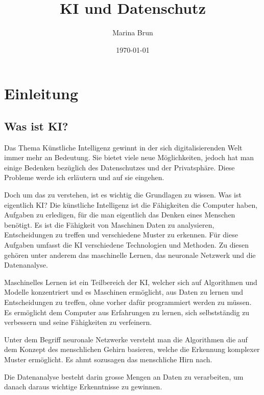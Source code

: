 \documentclass{report}
\title{KI und Datenschutz}
\author{Marina Brun}
\date{\today}
\begin{document}
\maketitle



\tableofcontents

\chapter{Einleitung}

\section{Was ist KI?}

Das Thema Künstliche Intelligenz gewinnt in der sich digitalisierenden Welt immer mehr an Bedeutung. Sie bietet viele neue Möglichkeiten, jedoch hat man einige Bedenken bezüglich des Datenschutzes und der Privatsphäre. Diese Probleme werde ich erläutern und auf sie eingehen.

\vspace{2mm}Doch um das zu verstehen, ist es wichtig die Grundlagen zu wissen. Was ist eigentlich KI? Die künstliche Intelligenz ist die Fähigkeiten die Computer haben, Aufgaben zu erledigen, für die man eigentlich das Denken eines Menschen benötigt. Es ist die Fähigkeit von Maschinen Daten zu analysieren, Entscheidungen zu treffen und verschiedene Muster zu erkennen. Für diese Aufgaben umfasst die KI verschiedene Technologien und Methoden. Zu diesen gehören unter anderem das maschinelle Lernen, das neuronale Netzwerk und die Datenanalyse.

\vspace{2mm}Maschinelles Lernen ist ein Teilbereich der KI, welcher sich auf Algorithmen und Modelle konzentriert und es Maschinen ermöglicht, aus Daten zu lernen und Entscheidungen zu treffen, ohne vorher dafür programmiert werden zu müssen. Es ermöglicht dem Computer aus Erfahrungen zu lernen, sich selbstständig zu verbessern und seine Fähigkeiten zu verfeinern.

\vspace{2mm}Unter dem Begriff neuronale Netzwerke versteht man die Algorithmen die auf dem Konzept des menschlichen Gehirn basieren, welche die Erkennung komplexer Muster ermöglicht.  Es ahmt sozusagen das menschliche Hirn nach.

\vspace{2mm}Die Datenanalyse besteht darin grosse Mengen an Daten zu verarbeiten, um danach daraus wichtige Erkenntnisse zu gewinnen.
\end{document}
